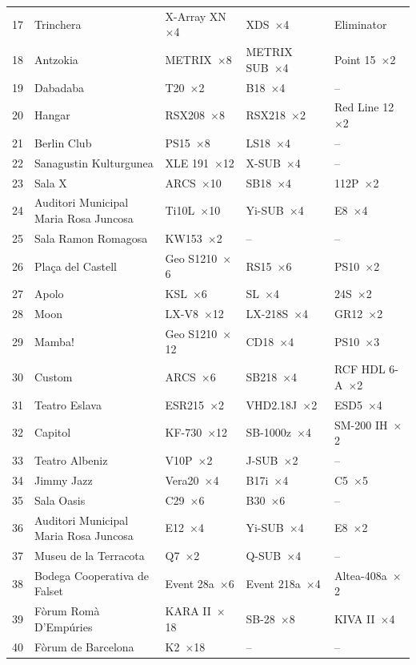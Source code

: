\begin{longtable}{@{}r p{2.9cm} p{2.9cm} p{2.6cm} p{1.9cm}@{}}
17 & Trinchera & X-Array XN~$\times$4 & XDS~$\times$4 & Eliminator \\
18 & Antzokia & METRIX~$\times$8 & METRIX SUB~$\times$4 & Point 15~$\times$2 \\
19 & Dabadaba & T20~$\times$2 & B18~$\times$4 & -- \\
20 & Hangar & RSX208~$\times$8 & RSX218~$\times$2 & Red Line 12~$\times$2 \\
21 & Berlin Club & PS15~$\times$8 & LS18~$\times$4 & -- \\
22 & Sanagustin Kulturgunea & XLE 191~$\times$12 & X-SUB~$\times$4 & -- \\
23 & Sala X & ARCS~$\times$10 & SB18~$\times$4 & 112P~$\times$2 \\
24 & Auditori Municipal Maria Rosa Juncosa & Ti10L~$\times$10 & Yi-SUB~$\times$4 & E8~$\times$4 \\
25 & Sala Ramon Romagosa & KW153~$\times$2 & -- & -- \\
26 & Plaça del Castell & Geo S1210~$\times$6 & RS15~$\times$6 & PS10~$\times$2 \\
27 & Apolo & KSL~$\times$6 & SL~$\times$4 & 24S~$\times$2 \\
28 & Moon & LX-V8~$\times$12 & LX-218S~$\times$4 & GR12~$\times$2 \\
29 & Mamba! & Geo S1210~$\times$12 & CD18~$\times$4 & PS10~$\times$3 \\
30 & Custom & ARCS~$\times$6 & SB218~$\times$4 & RCF HDL 6-A~$\times$2 \\
31 & Teatro Eslava & ESR215~$\times$2 & VHD2.18J~$\times$2 & ESD5~$\times$4 \\
32 & Capitol & KF-730~$\times$12 & SB-1000z~$\times$4 & SM-200 IH~$\times$2 \\
33 & Teatro Albeniz & V10P~$\times$2 & J-SUB~$\times$2 & -- \\
34 & Jimmy Jazz & Vera20~$\times$4 & B17i~$\times$4 & C5~$\times$5 \\
35 & Sala Oasis & C29~$\times$6 & B30~$\times$6 & -- \\
36 & Auditori Municipal Maria Rosa Juncosa & E12~$\times$4 & Yi-SUB~$\times$4 & E8~$\times$2 \\
37 & Museu de la Terracota & Q7~$\times$2 & Q-SUB~$\times$4 & -- \\
38 & Bodega Cooperativa de Falset & Event 28a~$\times$6 & Event 218a~$\times$4 & Altea-408a~$\times$2 \\
39 & Fòrum Romà D'Empúries & KARA II~$\times$18 & SB-28~$\times$8 & KIVA II~$\times$4 \\
40 & Fòrum de Barcelona & K2~$\times$18 & -- & -- \\
\end{longtable}


